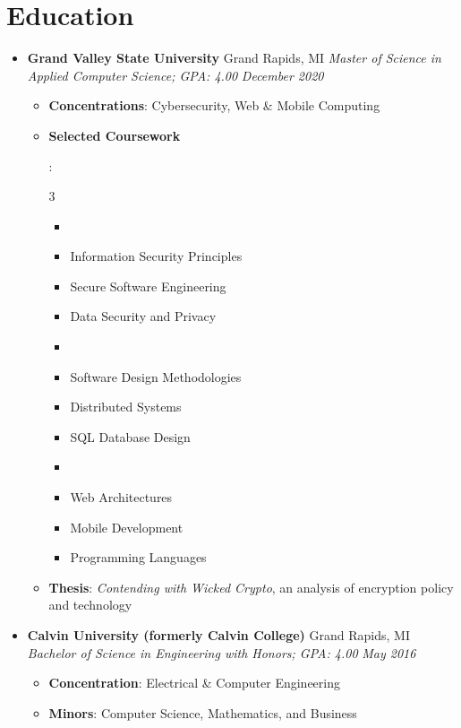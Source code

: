 \documentclass[letterpaper,11pt]{article}
\newcommand{\resumeItem}[2]{
  \item\small{
    \textbf{#1}{: #2 \vspace{-2pt}}
  }
}
\newcommand{\resumeSubheading}[4]{
  \vspace{-1pt}\item
    \textbf{#1} \dotfill #2 \newline
    \textit{\small#3} \hfill \textit{\small #4}
  \vspace{-5pt}
}
\newcommand{\resumeSubHeadingListStart}{\begin{itemize}[leftmargin=*]}
\newcommand{\resumeSubHeadingListEnd}{\end{itemize}}
\newcommand{\resumeItemListStart}{\begin{itemize}}
\newcommand{\resumeItemListEnd}{\end{itemize}\vspace{-5pt}}
\newcommand{\resumeListMulticolStart}[1]{
  \vspace{-2.4em}
  \setlength{\columnsep}{-1pc}
  \begin{multicols}{#1}
    \begin{itemize}[label={}]
      \item
}
\newcommand{\resumeListMulticolEnd}{
    \end{itemize}
  \end{multicols}
  \vspace{-10pt}
}
\begin{document}
\section{Education}
  \resumeSubHeadingListStart
    \resumeSubheading
      {Grand Valley State University}{Grand Rapids, MI}
      {Master of Science in Applied Computer Science; GPA: 4.00}{December 2020}
      \resumeItemListStart
        \resumeItem{Concentrations}
          {Cybersecurity, Web \& Mobile Computing}
        \resumeItem{Selected Coursework}
          {
            \resumeListMulticolStart{3}
              \item Information Security Principles
              \item Secure Software Engineering
              \item Data Security and Privacy
              \item %
              \item Software Design Methodologies
              \item Distributed Systems
              \item SQL Database Design
              \item %
              \item Web Architectures
              \item Mobile Development
              \item Programming Languages
            \resumeListMulticolEnd
          }
        \resumeItem{Thesis}
          {\textit{Contending with Wicked Crypto}, an analysis of encryption policy and technology}
      \resumeItemListEnd
    \resumeSubheading
      {Calvin University (formerly Calvin College)}{Grand Rapids, MI}
      {Bachelor of Science in Engineering with Honors; GPA: 4.00}{May 2016}
      \resumeItemListStart
        \resumeItem{Concentration}
          {Electrical \& Computer Engineering}
        \resumeItem{Minors}
          {Computer Science, Mathematics, and Business}
      \resumeItemListEnd
  \resumeSubHeadingListEnd
\end{document}
